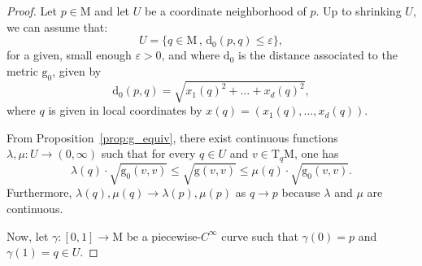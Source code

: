 \documentclass[pdflatex,sn-mathphys-ay]{sn-jnl}%
\newcommand{\man}{\mathrm{M}}
\newcommand{\dis}{\mathrm{d}}
\newcommand{\g}{\mathrm{g}}
\newcommand{\tangent}{\mathrm{T}}
\newcommand{\eps}{\varepsilon}
\theoremstyle{thmstyleone}%
\begin{document}
\begin{appendices}
\begin{proof}
Let $p\in\man$ and let $U$ be a coordinate neighborhood of $p$.
Up to shrinking $U$, we can assume that:
$$U=\{q\in\man\, ,\, \dis_0(p,q)\leq\eps\},$$
for a given, small enough $\eps>0$, and where $\dis_0$ is the distance associated to the metric $\g_0$, given by 
$$\dis_0(p,q)=\sqrt{x_1(q)^2+\dots+x_d(q)^2},$$
where $q$ is given in local coordinates by $x(q)=(x_1(q),...,x_d(q))$.

From Proposition~\ref{prop:g_equiv}, there exist continuous functions $\lambda,\mu\colon U\rightarrow(0,\infty)$ such that for every $q\in U$ and $v\in\tangent_q\man$, one has
$$\lambda(q)\cdot \sqrt{\g_0(v,v)}\leq \sqrt{\g(v,v)}\leq \mu(q)\cdot \sqrt{\g_0(v,v)}.$$
Furthermore, $\lambda(q),\mu(q)\rightarrow \lambda(p),\mu(p)$ as $q\rightarrow p$ because $\lambda$ and $\mu$ are continuous.

Now, let $\gamma\colon[0,1]\rightarrow\man$ be a piecewise-$C^{\infty}$ curve such that $\gamma(0)=p$ and $\gamma(1)=q\in U$.


\end{proof}
\end{appendices}
\end{document}
